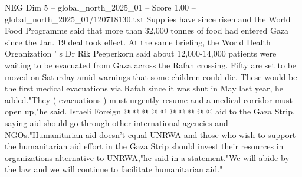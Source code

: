 \begin{textsample}{NEG Dim 5 – global\_north\_2025\_01 – Score 1.00 – global\_north\_2025\_01/120718130.txt}
Supplies have since risen and the World Food Programme said that more than 32,000 tonnes of food had entered Gaza since the Jan. 19 deal took effect.
At the same briefing, the World Health Organization ' s Dr Rik Peeperkorn said about 12,000-14,000 patients were waiting to be evacuated from Gaza across the Rafah crossing.
Fifty are set to be moved on Saturday amid warnings that some children could die.
These would be the first medical evacuations via Rafah since it was shut in May last year, he added."They ( evacuations ) must urgently resume and a medical corridor must open up,"he said.
Israeli Foreign @ @ @ @ @ @ @ @ @ @ aid to the Gaza Strip, saying aid should go through other international agencies and NGOs."Humanitarian aid doesn't equal UNRWA and those who wish to support the humanitarian aid effort in the Gaza Strip should invest their resources in organizations alternative to UNRWA,"he said in a statement."We will abide by the law and we will continue to facilitate humanitarian aid."

\end{textsample}
